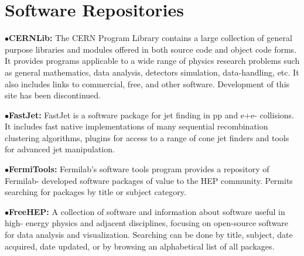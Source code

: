 \medskip


\section{Software Repositories}  %

\medskip

\medskip

\item{$\bullet$}{\bf CERNLib:} The CERN Program Library contains a large collection of general purpose libraries and modules offered in both source code and object code forms. It provides programs applicable to a wide range of physics research problems such as general mathematics, data analysis, detectors simulation, data-handling, etc. It also includes links to commercial, free, and other software. Development of this site has been discontinued.
	\item{}

\medskip

\item{$\bullet$}{\bf FastJet:} FastJet is a software package for jet finding in pp and e+e- collisions. It includes fast native implementations of many sequential recombination clustering algorithms, plugins for access to a range of cone jet finders and tools for advanced jet manipulation.
	\item{}

\medskip

\item{$\bullet$}{\bf FermiTools:}
Fermilab's software tools program provides a repository of Fermilab- developed software packages of value to the HEP community. Permits searching for packages by title or subject category.
	\item{}

\medskip

\item{$\bullet$}{\bf FreeHEP:}
A collection of software and information about software useful in high- energy physics and adjacent disciplines, focusing on open-source software for data analysis and visualization. Searching can be done by title, subject, date acquired, date updated, or by browsing an alphabetical list of all packages.
	\item{}

\medskip

